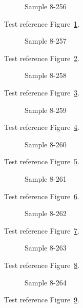 \begin{figure}[tbhp]
\caption{Sample 8-256}
\label{fig:sample-8-256}
\end{figure}

Test reference Figure~\ref{fig:sample-8-256}.

\begin{figure}[tbhp]
\caption{Sample 8-257}
\label{fig:sample-8-257}
\end{figure}

Test reference Figure~\ref{fig:sample-8-257}.

\begin{figure}[tbhp]
\caption{Sample 8-258}
\label{fig:sample-8-258}
\end{figure}

Test reference Figure~\ref{fig:sample-8-258}.

\begin{figure}[tbhp]
\caption{Sample 8-259}
\label{fig:sample-8-259}
\end{figure}

Test reference Figure~\ref{fig:sample-8-259}.

\begin{figure}[tbhp]
\caption{Sample 8-260}
\label{fig:sample-8-260}
\end{figure}

Test reference Figure~\ref{fig:sample-8-260}.

\begin{figure}[tbhp]
\caption{Sample 8-261}
\label{fig:sample-8-261}
\end{figure}

Test reference Figure~\ref{fig:sample-8-261}.

\begin{figure}[tbhp]
\caption{Sample 8-262}
\label{fig:sample-8-262}
\end{figure}

Test reference Figure~\ref{fig:sample-8-262}.

\begin{figure}[tbhp]
\caption{Sample 8-263}
\label{fig:sample-8-263}
\end{figure}

Test reference Figure~\ref{fig:sample-8-263}.

\begin{figure}[tbhp]
\caption{Sample 8-264}
\label{fig:sample-8-264}
\end{figure}

Test reference Figure~\ref{fig:sample-8-264}.

